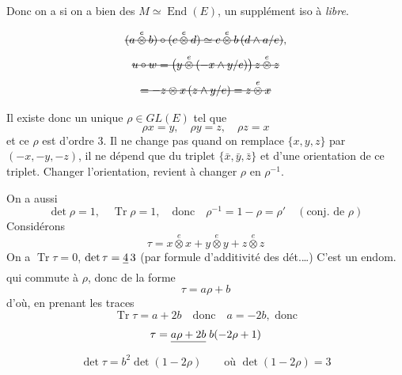\documentclass[11pt,a4paper]{article}
\begin{document}
Donc on a  si on a bien des  $M\simeq\operatorname{End}(E)$, un supplément  iso à \ill{} \emph{libre}.

\[
  \text{\struck{$(a\overset{e}{\otimes}b)\circ(c\overset{e}{\otimes}d) \simeq c\overset{e}{\otimes}b\,(d\wedge a/e)$}} ,
\]
\[
  \text{\struck{$u\circ w = \bigl(y\overset{e}{\otimes}(-x\wedge y/e)\bigr)\, z\overset{e}{\otimes}z$}}
\]
\[
  \text{\struck{$= -z\otimes x\,(z\wedge y/e) = z\overset{e}{\otimes}x$}}
\]

Il existe donc un unique $\rho\in GL(E)$ tel que
\[
  \rho x = y, \quad \rho y = z, \quad \rho z = x
\]
et ce $\rho$ est d'ordre $3$. Il ne change pas quand on remplace $\{x,y,z\}$ par $(-x,-y,-z)$, il ne dépend que du triplet $\{\bar x,\bar y,\bar z\}$ et d'une orientation de ce triplet. Changer l'orientation, revient à changer $\rho$ en $\rho^{-1}$.

On a aussi
\[
  \det\rho = 1, \quad \operatorname{Tr}\rho = 1, \quad\text{donc}\quad \rho^{-1} = 1-\rho = \rho' \quad (\text{conj. de } \rho)
\]
Considérons
\[
  \tau = x\overset{e}{\otimes}x + y\overset{e}{\otimes}y + z\overset{e}{\otimes}z
\]
On a $\operatorname{Tr}\tau = 0$, $\det\tau = \struck{4}\,3$ (par formule d'additivité des dét.…) C'est un endom. qui commute à $\rho$, donc de la forme
\[
  \tau = a\rho + b
\]
d'où, en prenant les traces
\[
  \operatorname{Tr}\tau = a + 2b \quad\text{donc}\quad a = -2b, \text{ donc}
\]
\[
  \tau = \struck{a\rho+2b}\; b(-2\rho+1)
\]
\[
  \det\tau = b^2\det(1-2\rho) \qquad\text{où } \det(1-2\rho) = 3
\]
\end{document}
